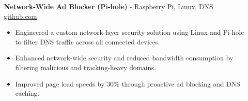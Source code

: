 \documentclass[11pt]{article}       %
\begin{document}

\textbf{Network-Wide Ad Blocker (Pi-hole)}{ - Raspberry Pi, Linux, DNS} \hfill \href{https://github.com/Monica20030707}{github.com} \\
\vspace{-9pt}
\begin{itemize}
  \item Engineered a custom network-layer security solution using Linux and Pi-hole to filter DNS traffic across all connected devices.
  \item Enhanced network-wide security and reduced bandwidth consumption by filtering malicious and tracking-heavy domains.
  \item Improved page load speeds by 30\% through proactive ad blocking and DNS caching.
\end{itemize}

\end{document}

